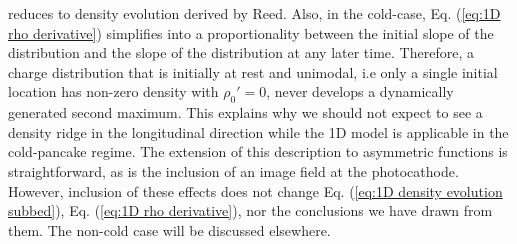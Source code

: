 \documentclass[aps,prl,twocolumn,showpacs,superscriptaddress,groupedaddress]{revtex4-1}  %
\begin{document}
{reduces to  density evolution
derived by Reed\cite{Reed:2006_short_pulse_theory}.  Also, in the cold-case,
Eq. (\ref{eq:1D rho derivative}) simplifies into a proportionality
between the initial slope of the distribution and the slope of the distribution at
any later time.  
Therefore, a charge distribution that is initially at rest and unimodal, i.e only
a single initial location has non-zero density with $\rho_0' = 0$,  
never develops 
a dynamically generated second maximum.
This explains why we should not expect to see a density ridge in the longitudinal direction
while the 1D model is applicable in the cold-pancake regime.
The extension of this description to asymmetric functions is straightforward, as is the inclusion of an 
image field at the photocathode.  However, inclusion of these effects does not change
Eq. (\ref{eq:1D density evolution subbed}), Eq. (\ref{eq:1D rho derivative}), nor the conclusions
we have drawn from them.  The non-cold case will be discussed elsewhere.

}
\end{document}
